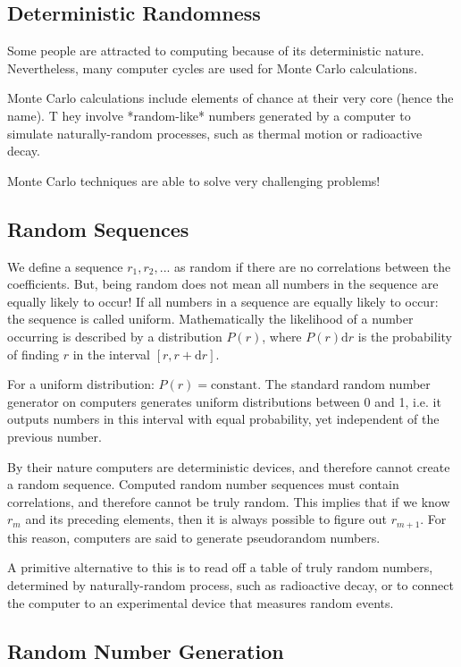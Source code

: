 \documentclass[../../../main.tex]{subfiles}
\begin{document}
\subsection{Deterministic Randomness}

Some people are attracted to computing because of its deterministic nature. 
Nevertheless, many computer cycles are used for Monte Carlo calculations. 

Monte Carlo calculations include elements of chance at their very core (hence the name). T
hey involve *random-like* numbers generated by a computer to simulate naturally-random processes, such as thermal motion or radioactive decay. 

Monte Carlo techniques are able to solve very challenging problems!

\subsection{Random Sequences}

We define a sequence $r_1, r_2,...$ as random if there are no correlations between the coefficients. 
But, being random does not mean all numbers in the sequence are equally likely to occur! 
If all numbers in a sequence are equally likely to occur: the sequence is called uniform.
Mathematically the likelihood of a number occurring is described by a distribution $P(r)$, where $P(r)\mathrm{d}r$ is the probability of finding $r$ in the interval $[r, r+\mathrm{d}r]$. 

For a uniform distribution: $P(r) = \mathrm{constant}$. 
The standard random number generator on computers generates uniform distributions between 0 and 1, i.e. it outputs numbers in this interval with equal probability, yet independent of the previous number. 

By their nature computers are deterministic devices, and therefore cannot create a random sequence. 
Computed random number sequences must contain correlations, and therefore cannot be truly random. 
This implies that if we know $r_m$ and its preceding elements, then it is always possible to figure out $r_{m+1}$. 
For this reason, computers are said to generate pseudorandom numbers. 

A primitive alternative to this is to read off a table of truly random numbers, determined by  naturally-random process, such as radioactive decay, or to connect the computer to an experimental device that measures random events. 

\subsection{Random Number Generation}
\end{document}
